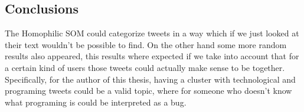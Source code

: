 \subsection{Conclusions}
The Homophilic \ac{SOM} could categorize tweets in a way which if we just looked at their text wouldn't  be possible to find. On the other hand some more random results also appeared, this results where expected if we take into account that for a certain kind of users those tweets could actually make sense to be together. Specifically, for the author of this thesis, having a cluster with technological and programing tweets could be a valid topic, where for someone who doesn't know what programing is could be interpreted as a bug.
\cleardoublepage



 

